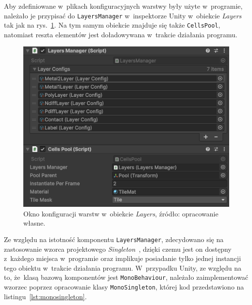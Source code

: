 Aby zdefiniowane w~plikach konfiguracyjnych warstwy były użyte w~programie,
należało je przypisać do \texttt{LayersManager} w~inspektorze Unity w~obiekcie \textit{Layers} tak jak na rys.~\ref{fig:layers}.
Na tym samym obiekcie znajduje się także \texttt{CellsPool},
natomiast reszta elementów jest doładowywana w~trakcie działania programu.

\newpage %

\begin{figure}[h]
    \centering
    \includegraphics[width=.9\textwidth]{chapters/chapter4/rys/layers}
    \caption[Okno konfiguracji warstw w~obiekcie \textit{Layers}.]
    {Okno konfiguracji warstw w~obiekcie \textit{Layers}, źródło: opracowanie własne.}
    \label{fig:layers}
\end{figure}

Ze względu na istotność komponentu \texttt{LayersManager},
zdecydowano się na zastosowanie wzorca projektowego \textit{Singleton}~\cite{unity_csharp},
dzięki czemu jest on dostępny z~każdego miejsca w~programie
oraz implikuje posiadanie tylko jednej instancji tego obiektu w~trakcie działania programu.
W~przypadku Unity, ze względu na to, że~klasą bazową komponentów jest \texttt{MonoBehaviour},
należało zaimplementować wzorzec poprzez opracowanie klasy \texttt{MonoSingleton},
której kod przedstawiono na listingu~\ref{lst:monosingleton}.


